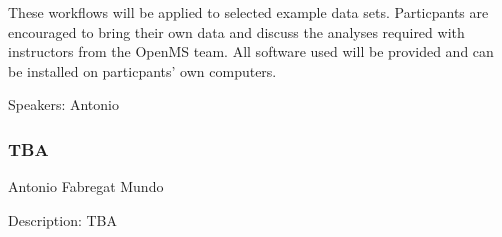 These workflows will be applied to selected example data sets. Particpants are
encouraged to bring their own data and discuss the analyses required with
instructors from the OpenMS team. All software used will be provided and can be
installed on particpants' own computers.


Speakers: Antonio
\subsubsection*{\color{eubicRed} TBA}
{\color{eubicGray} Antonio Fabregat Mundo}

Description: TBA
